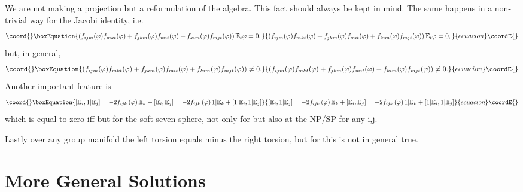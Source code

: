 \documentclass[a4paper,12pt]{book}
\begin{document}
We are not making a projection but a reformulation of the algebra. This fact
should always be kept in mind. The same happens in a non-trivial way for the
Jacobi identity, i.e. 
\begin{equation}\coord{}\boxEquation{
\left( f_{ijm}(\varphi )f_{mkt}(\varphi )+f_{jkm}(\varphi )f_{mit}(\varphi
)+f_{kim}(\varphi )f_{mjt}(\varphi )\right) \Bbb{E}_{t}\varphi =0,
}{
\left( f_{ijm}(\varphi )f_{mkt}(\varphi )+f_{jkm}(\varphi )f_{mit}(\varphi
)+f_{kim}(\varphi )f_{mjt}(\varphi )\right) \Bbb{E}_{t}\varphi =0,
}{ecuacion}\coordE{}\end{equation}
but, in general, 
\begin{equation}\coord{}\boxEquation{
\left( f_{ijm}(\varphi )f_{mkt}(\varphi )+f_{jkm}(\varphi )f_{mit}(\varphi
)+f_{kim}(\varphi )f_{mjt}(\varphi )\right) \neq 0.
}{
\left( f_{ijm}(\varphi )f_{mkt}(\varphi )+f_{jkm}(\varphi )f_{mit}(\varphi
)+f_{kim}(\varphi )f_{mjt}(\varphi )\right) \neq 0.
}{ecuacion}\coordE{}\end{equation}
Another important feature is 
\begin{equation}\coord{}\boxEquation{
\left[ \Bbb{E}_{i},1|\Bbb{E}_{j}\right] =-2f_{ijk}\left( \varphi \right) 
\Bbb{E}_{k}+\left[ \Bbb{E}_{i},\Bbb{E}_{j}\right] =-2f_{ijk}\left( \varphi
\right) 1|\Bbb{E}_{k}+\left[ 1|\Bbb{E}_{i},1|\Bbb{E}_{j}\right]
}{
\left[ \Bbb{E}_{i},1|\Bbb{E}_{j}\right] =-2f_{ijk}\left( \varphi \right) 
\Bbb{E}_{k}+\left[ \Bbb{E}_{i},\Bbb{E}_{j}\right] =-2f_{ijk}\left( \varphi
\right) 1|\Bbb{E}_{k}+\left[ 1|\Bbb{E}_{i},1|\Bbb{E}_{j}\right]
}{ecuacion}\coordE{}\end{equation}
which is equal to zero iff \coordHE{} but for the soft seven sphere, \coordHE{} not only for \coordHE{} but also at the
NP/SP for any i,j.

Lastly over any group manifold the left torsion equals minus the right
torsion, but for \coordHE{} this is not in general true.

\section{More General Solutions}
\end{document}
